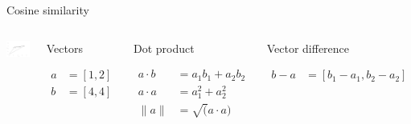 \documentclass[
  10pt,
  ignorenonframetext,
  x11names, dvipsnames, bibspacing,natbib, table]{beamer}
\begin{document}
\begin{frame}{Cosine similarity}
\protect\hypertarget{cosine-similarity-2}{}
\begin{columns}
    

\begin{center}\includegraphics[width=1\linewidth]{presentationBoston_files/figure-beamer/cosine3-1} \end{center}




\footnotesize 


\begin{block}{Vectors}

\begin{align*}
a  & = [1,2]\\
b  &= [4,4]
\end{align*}

\end{block}


\begin{block}{Dot product}

\begin{align*}
a \cdot b & = a_1 b_1 + a_2 b_2\\
a \cdot a & = a_1^2 + a_2 ^ 2 \\
\lVert a\rVert & = \sqrt(a \cdot a)
\end{align*}

\end{block}


\begin{block}{Vector difference}

\begin{align*}
b - a & = [b_1- a_1, b_2 - a_2 ]
\end{align*}

\end{block}

\end{columns}
\end{frame}
\end{document}
